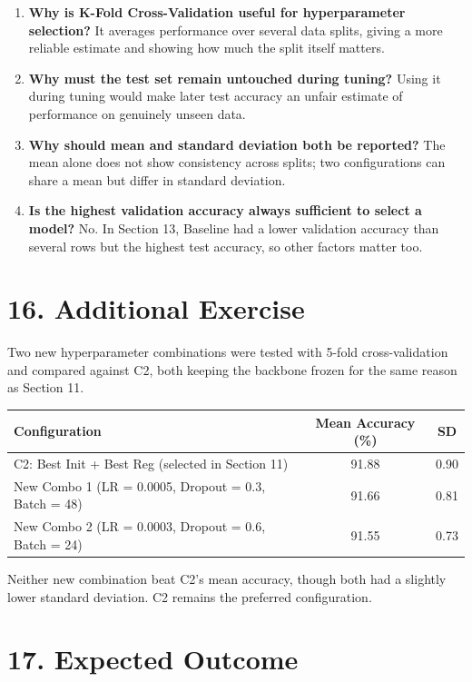 \documentclass[10pt]{article}
\begin{document}
\begin{enumerate}
\item \textbf{Why is K-Fold Cross-Validation useful for hyperparameter selection?}
It averages performance over several data splits, giving a more reliable estimate and showing
how much the split itself matters.

\item \textbf{Why must the test set remain untouched during tuning?}
Using it during tuning would make later test accuracy an unfair estimate of performance on
genuinely unseen data.

\item \textbf{Why should mean and standard deviation both be reported?}
The mean alone does not show consistency across splits; two configurations can share a mean
but differ in standard deviation.

\item \textbf{Is the highest validation accuracy always sufficient to select a model?}
No. In Section 13, Baseline had a lower validation accuracy than several rows but the highest
test accuracy, so other factors matter too.
\end{enumerate}

\section*{16. Additional Exercise}

Two new hyperparameter combinations were tested with 5-fold cross-validation and compared
against C2, both keeping the backbone frozen for the same reason as Section 11.

\begin{center}
\begin{tabular}{|l|c|c|}
\hline
Configuration & Mean Accuracy (\%) & SD\\
\hline
C2: Best Init + Best Reg (selected in Section 11) & 91.88 & 0.90\\
New Combo 1 (LR = 0.0005, Dropout = 0.3, Batch = 48) & 91.66 & 0.81\\
New Combo 2 (LR = 0.0003, Dropout = 0.6, Batch = 24) & 91.55 & 0.73\\
\hline
\end{tabular}
\end{center}

Neither new combination beat C2's mean accuracy, though both had a slightly lower standard
deviation. C2 remains the preferred configuration.

\section*{17. Expected Outcome}
\end{document}

